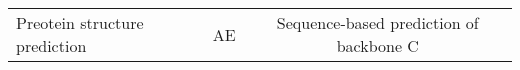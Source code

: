 \begin{center}
\begin{tabular}{l c c}
    Preotein structure prediction & AE & Sequence-based prediction of backbone C 
\end{tabular}
\end{center}